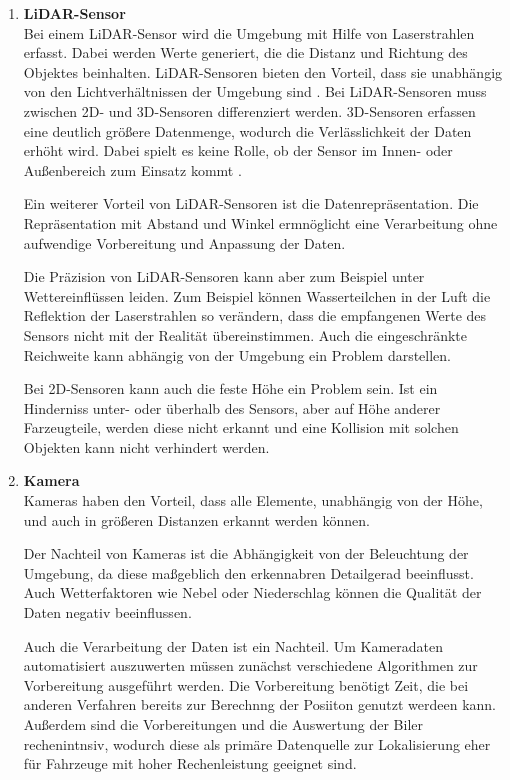 \begin{enumerate}[leftmargin=*]
    \item \textbf{LiDAR-Sensor} \\
    Bei einem LiDAR-Sensor wird die Umgebung mit Hilfe von Laserstrahlen erfasst.
    Dabei werden Werte generiert, die die Distanz und Richtung des Objektes beinhalten. 
    LiDAR-Sensoren bieten den Vorteil, dass sie unabhängig von den Lichtverhältnissen der Umgebung sind \cite{lidar}. 
    Bei LiDAR-Sensoren muss zwischen 2D- und 3D-Sensoren differenziert werden. 
    3D-Sensoren erfassen eine deutlich größere Datenmenge, wodurch die Verlässlichkeit der Daten erhöht wird.
    Dabei spielt es keine Rolle, ob der Sensor im Innen- oder Außenbereich zum Einsatz kommt \cite{lidar}. 

    Ein weiterer Vorteil von LiDAR-Sensoren ist die Datenrepräsentation.
    Die Repräsentation mit Abstand und Winkel ermnöglicht eine Verarbeitung ohne aufwendige Vorbereitung und Anpassung der Daten.
    
    Die Präzision von LiDAR-Sensoren kann aber zum Beispiel unter Wettereinflüssen leiden. 
    Zum Beispiel können Wasserteilchen in der Luft die Reflektion der Laserstrahlen so verändern, dass die empfangenen Werte des Sensors nicht mit der Realität übereinstimmen.
    Auch die eingeschränkte Reichweite kann abhängig von der Umgebung ein Problem darstellen.

    Bei 2D-Sensoren kann auch die feste Höhe ein Problem sein.
    Ist ein Hinderniss unter- oder überhalb des Sensors, aber auf Höhe anderer Farzeugteile, 
    werden diese nicht erkannt und eine Kollision mit solchen Objekten kann nicht verhindert werden. 

    \item \textbf{Kamera} \\
    Kameras haben den Vorteil, dass alle Elemente, unabhängig von der Höhe, und auch in größeren Distanzen erkannt werden können. 

    Der Nachteil von Kameras ist die Abhängigkeit von der Beleuchtung der Umgebung, da diese maßgeblich den erkennabren Detailgerad beeinflusst.
    Auch Wetterfaktoren wie Nebel oder Niederschlag können die Qualität der Daten negativ beeinflussen.

    Auch die Verarbeitung der Daten ist ein Nachteil. 
    Um Kameradaten automatisiert auszuwerten müssen zunächst verschiedene Algorithmen zur Vorbereitung ausgeführt werden. 
    Die Vorbereitung benötigt Zeit, die bei anderen Verfahren bereits zur Berechnng der Posiiton genutzt werdeen kann.
    Außerdem sind die Vorbereitungen und die Auswertung der Biler rechenintnsiv, 
    wodurch diese als primäre Datenquelle zur Lokalisierung eher für Fahrzeuge mit hoher Rechenleistung geeignet sind.


\end{enumerate}
